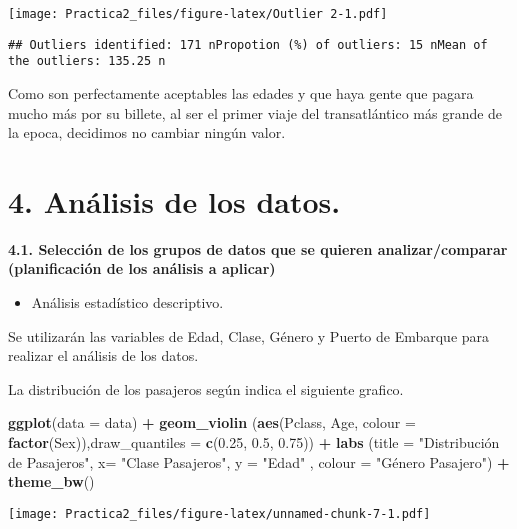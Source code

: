 \documentclass[]{article}
\newenvironment{Shaded}{\begin{snugshade}}{\end{snugshade}}
\newcommand{\KeywordTok}[1]{\textcolor[rgb]{0.13,0.29,0.53}{\textbf{#1}}}
\newcommand{\DataTypeTok}[1]{\textcolor[rgb]{0.13,0.29,0.53}{#1}}
\newcommand{\FloatTok}[1]{\textcolor[rgb]{0.00,0.00,0.81}{#1}}
\newcommand{\StringTok}[1]{\textcolor[rgb]{0.31,0.60,0.02}{#1}}
\newcommand{\OperatorTok}[1]{\textcolor[rgb]{0.81,0.36,0.00}{\textbf{#1}}}
\newcommand{\NormalTok}[1]{#1}
\providecommand{\tightlist}{%
  \setlength{\itemsep}{0pt}\setlength{\parskip}{0pt}}
\begin{document}
\texttt{[image: Practica2\_files/figure-latex/Outlier 2-1.pdf]}

\begin{verbatim}
## Outliers identified: 171 nPropotion (%) of outliers: 15 nMean of the outliers: 135.25 n
\end{verbatim}

Como son perfectamente aceptables las edades y que haya gente que pagara
mucho más por su billete, al ser el primer viaje del transatlántico más
grande de la epoca, decidimos no cambiar ningún valor.

\section{4. Análisis de los datos.}\label{analisis-de-los-datos.}

\textbf{4.1. Selección de los grupos de datos que se quieren
analizar/comparar (planificación de los análisis a aplicar)}

\begin{itemize}
\tightlist
\item
  Análisis estadístico descriptivo.
\end{itemize}

Se utilizarán las variables de Edad, Clase, Género y Puerto de Embarque
para realizar el análisis de los datos.

La distribución de los pasajeros según indica el siguiente grafico.

\begin{Shaded}
\begin{Highlighting}[]
\KeywordTok{ggplot}\NormalTok{(}\DataTypeTok{data =}\NormalTok{ data) }\OperatorTok{+}
\StringTok{  }\KeywordTok{geom_violin}\NormalTok{ (}\KeywordTok{aes}\NormalTok{(Pclass, Age, }\DataTypeTok{colour =} \KeywordTok{factor}\NormalTok{(Sex)),}\DataTypeTok{draw_quantiles =} \KeywordTok{c}\NormalTok{(}\FloatTok{0.25}\NormalTok{, }\FloatTok{0.5}\NormalTok{, }\FloatTok{0.75}\NormalTok{)) }\OperatorTok{+}
\StringTok{  }\KeywordTok{labs}\NormalTok{ (}\DataTypeTok{title =} \StringTok{"Distribución de Pasajeros"}\NormalTok{, }\DataTypeTok{x=} \StringTok{"Clase Pasajeros"}\NormalTok{, }
        \DataTypeTok{y =} \StringTok{"Edad"}\NormalTok{ , }\DataTypeTok{colour =} \StringTok{"Género Pasajero"}\NormalTok{) }\OperatorTok{+}
\StringTok{  }\KeywordTok{theme_bw}\NormalTok{()}
\end{Highlighting}
\end{Shaded}

\texttt{[image: Practica2\_files/figure-latex/unnamed-chunk-7-1.pdf]}
\end{document}
